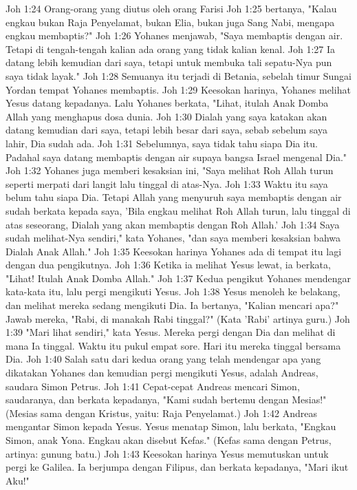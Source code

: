 Joh 1:24  Orang-orang yang diutus oleh orang Farisi
Joh 1:25  bertanya, "Kalau engkau bukan Raja Penyelamat, bukan Elia, bukan juga Sang Nabi, mengapa engkau membaptis?"
Joh 1:26  Yohanes menjawab, "Saya membaptis dengan air. Tetapi di tengah-tengah kalian ada orang yang tidak kalian kenal.
Joh 1:27  Ia datang lebih kemudian dari saya, tetapi untuk membuka tali sepatu-Nya pun saya tidak layak."
Joh 1:28  Semuanya itu terjadi di Betania, sebelah timur Sungai Yordan tempat Yohanes membaptis.
Joh 1:29  Keesokan harinya, Yohanes melihat Yesus datang kepadanya. Lalu Yohanes berkata, "Lihat, itulah Anak Domba Allah yang menghapus dosa dunia.
Joh 1:30  Dialah yang saya katakan akan datang kemudian dari saya, tetapi lebih besar dari saya, sebab sebelum saya lahir, Dia sudah ada.
Joh 1:31  Sebelumnya, saya tidak tahu siapa Dia itu. Padahal saya datang membaptis dengan air supaya bangsa Israel mengenal Dia."
Joh 1:32  Yohanes juga memberi kesaksian ini, "Saya melihat Roh Allah turun seperti merpati dari langit lalu tinggal di atas-Nya.
Joh 1:33  Waktu itu saya belum tahu siapa Dia. Tetapi Allah yang menyuruh saya membaptis dengan air sudah berkata kepada saya, 'Bila engkau melihat Roh Allah turun, lalu tinggal di atas seseorang, Dialah yang akan membaptis dengan Roh Allah.'
Joh 1:34  Saya sudah melihat-Nya sendiri," kata Yohanes, "dan saya memberi kesaksian bahwa Dialah Anak Allah."
Joh 1:35  Keesokan harinya Yohanes ada di tempat itu lagi dengan dua pengikutnya.
Joh 1:36  Ketika ia melihat Yesus lewat, ia berkata, "Lihat! Itulah Anak Domba Allah."
Joh 1:37  Kedua pengikut Yohanes mendengar kata-kata itu, lalu pergi mengikuti Yesus.
Joh 1:38  Yesus menoleh ke belakang, dan melihat mereka sedang mengikuti Dia. Ia bertanya, "Kalian mencari apa?" Jawab mereka, "Rabi, di manakah Rabi tinggal?" (Kata 'Rabi' artinya guru.)
Joh 1:39  "Mari lihat sendiri," kata Yesus. Mereka pergi dengan Dia dan melihat di mana Ia tinggal. Waktu itu pukul empat sore. Hari itu mereka tinggal bersama Dia.
Joh 1:40  Salah satu dari kedua orang yang telah mendengar apa yang dikatakan Yohanes dan kemudian pergi mengikuti Yesus, adalah Andreas, saudara Simon Petrus.
Joh 1:41  Cepat-cepat Andreas mencari Simon, saudaranya, dan berkata kepadanya, "Kami sudah bertemu dengan Mesias!" (Mesias sama dengan Kristus, yaitu: Raja Penyelamat.)
Joh 1:42  Andreas mengantar Simon kepada Yesus. Yesus menatap Simon, lalu berkata, "Engkau Simon, anak Yona. Engkau akan disebut Kefas." (Kefas sama dengan Petrus, artinya: gunung batu.)
Joh 1:43  Keesokan harinya Yesus memutuskan untuk pergi ke Galilea. Ia berjumpa dengan Filipus, dan berkata kepadanya, "Mari ikut Aku!"
